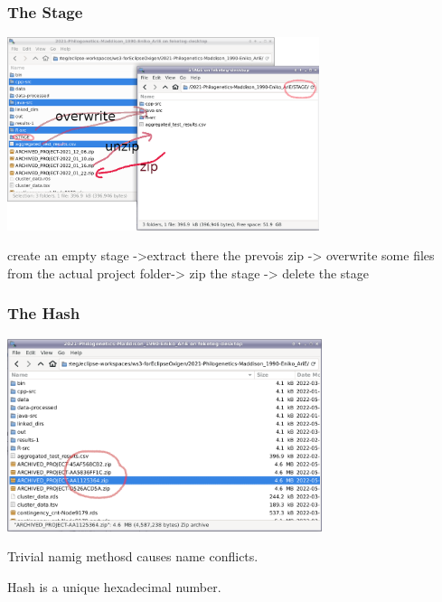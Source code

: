 \documentclass[aspectratio=169]{beamer}
\begin{document}
\begin{frame}
\frametitle<presentation>{The Stage}
\includegraphics[height=160pt]{pictures/project_folder_stageing-2.png}

 create an empty stage ->extract there the prevois zip -> overwrite some files from the actual project folder-> zip the stage -> delete the stage
\end{frame}


\begin{frame}
\frametitle<presentation>{The Hash}
\includegraphics[height=160pt]{pictures/project_folder_with_hash_named_zips.png}

Trivial namig methosd causes name conflicts.

Hash is a unique hexadecimal number.
\end{frame}
\end{document}
